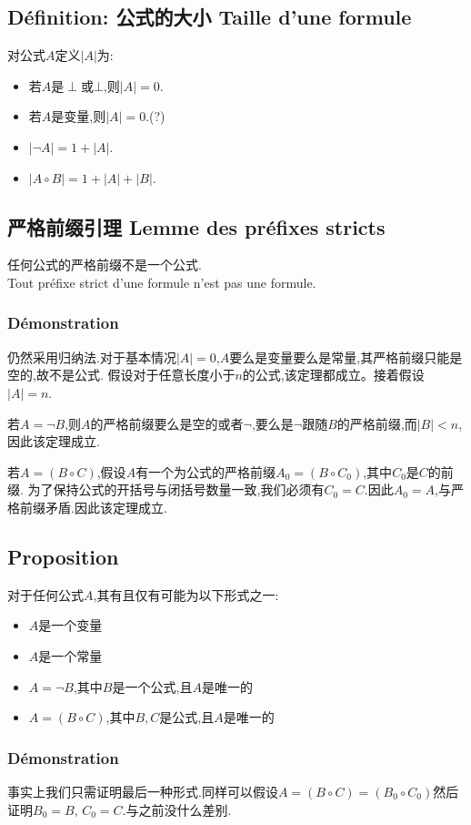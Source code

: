 \documentclass[12pt, a4paper, oneside]{ctexbook}
\begin{document}
  \subsection{Définition: 公式的大小 Taille d'une formule}
  对公式$A$定义$|A|$为:
  \begin{itemize}
    \item 若$A$是$\perp$或$\bot$,则$|A|=0$.
    \item 若$A$是变量,则$|A|=0$.(?)
    \item $|\lnot A|=1+|A|$.
    \item $|A\circ B|=1+|A|+|B|$.
  \end{itemize}
  \subsection{严格前缀引理 Lemme des préfixes stricts}
  任何公式的严格前缀不是一个公式.\\
  Tout préfixe strict d'une formule n'est pas une formule.
  \subsubsection{Démonstration}
  仍然采用归纳法.对于基本情况$|A|=0$,$A$要么是变量要么是常量,其严格前缀只能是空的,故不是公式.
  假设对于任意长度小于$n$的公式,该定理都成立。接着假设$|A|=n$.

  若$A=\lnot B$,则$A$的严格前缀要么是空的或者$\lnot$,要么是$\lnot$跟随$B$的严格前缀,而$|B|<n$,因此该定理成立.

  若$A=(B\circ C)$,假设$A$有一个为公式的严格前缀$A_0=(B\circ C_0)$,其中$C_0$是$C$的前缀.
  为了保持公式的开括号与闭括号数量一致,我们必须有$C_0=C$.因此$A_0=A$,与严格前缀矛盾.因此该定理成立.
  \subsection{Proposition}\label{myref:sixuanyi}
  对于任何公式$A$,其有且仅有可能为以下形式之一:
  \begin{itemize}
    \item $A$是一个变量
    \item $A$是一个常量
    \item $A=\lnot B$,其中$B$是一个公式,且$A$是唯一的
    \item $A=(B\circ C)$,其中$B,C$是公式,且$A$是唯一的
  \end{itemize}
  \subsubsection{Démonstration}
  事实上我们只需证明最后一种形式.同样可以假设$A=(B\circ C)=(B_0\circ C_0)$然后证明$B_0=B,\,C_0=C$.与之前没什么差别.
\end{document}

